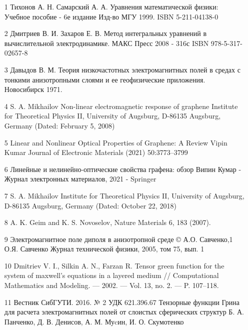 	\begin{itemize}
		\item [1] Тихонов А. Н. Самарский А. А. Уравнения математической физики: Учебное пособие - 6е издание Изд-во МГУ 1999. ISBN 5-211-04138-0 
		
		\item [2] Дмитриев В. И. Захаров Е. В. Метод интегральных уравнений в вычислительной электродинамике. МАКС Пресс 2008 - 316с ISBN 978-5-317-02657-8
		
		\item [3] Давыдов В. М. Теория низкочастотных электромагнитных полей в средах с тонкими анизотропными слоями и ее геофизические приложения. Новосибирск 1971.
		
		\item [4] S. A. Mikhailov
		Non-linear electromagnetic response of graphene
		Institute for Theoretical Physics II, University of Augsburg, D-86135
		Augsburg, Germany (Dated: February 5, 2008)
		
		\item [5] Linear and Nonlinear Optical Properties of Graphene: A Review
		Vipin Kumar Journal of Electronic Materials (2021) 50:3773–3799
		
		\item [6] Линейные и нелинейно-оптические свойства графена: обзор
		Випин Кумар - Журнал электронных материалов, 2021 - Springer
		
		\item [7] S. A. Mikhailov
		Institute for Theoretical Physics II, University of Augsburg, D-86135 Augsburg, Germany
		(Dated: October 22, 2018)
		
		\item [8] A. K. Geim and K. S. Novoselov, Nature Materials 6, 183 (2007).
		
		\item [9] Электромагнитное поле диполя в анизотропной среде
		© А.О. Савченко,1 О.Я. Савченко Журнал технической физики, 2005, том 75, вып. 1
		
		\item  [10] Dmitriev V. I., Silkin A. N., Farzan R. Tensor green function for the system of maxwell’s equations in a layered medium // Computational Mathematics and Modeling. — 2002. — Vol. 13, no. 2. — P. 107–118. 
		
		\item [11] Вестник СибГУТИ. 2016. № 2
		УДК 621.396.67
		Тензорные функции Грина
		для расчета электромагнитных полей 
		от слоистых сферических структур
		Б. А. Панченко, Д. В. Денисов, А. М. Муcин, И. О. Скумотенко
		

\end{itemize}
